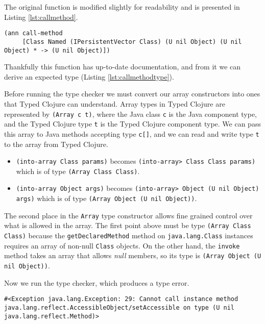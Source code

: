 The original function is modified slightly for readability and is presented in Listing \ref{lst:callmethod}.

\begin{lstlisting}[caption=call-method Type Annotation, label=lst:callmethodtype]
(ann call-method 
     [Class Named (IPersistentVector Class) (U nil Object) (U nil Object) * -> (U nil Object)])
\end{lstlisting}

Thankfully this function has up-to-date documentation, and from it we can derive an expected type
(Listing \ref{lst:callmethodtype}).

Before running the type checker we must convert our array constructors into ones that Typed Clojure
can understand. Array types in Typed Clojure are represented by \lstinline|(Array c t)|, where
the Java class \lstinline|c| is the Java component type,
and the Typed Clojure type \lstinline|t| is the Typed Clojure component type. 
We can pass this array to Java methods accepting
type \lstinline|c[]|, and we can read and write type \lstinline|t| to the array from Typed Clojure.

\begin{itemize}
\item \lstinline|(into-array Class params)| becomes \lstinline|(into-array> Class Class params)|
      which is of type \lstinline|(Array Class Class)|.
\item \lstinline|(into-array Object args)| becomes \lstinline|(into-array> Object (U nil Object) args)|
      which is of type \lstinline|(Array Object (U nil Object))|.
\end{itemize}

The second place in the \lstinline|Array| type constructor allows fine grained control over what is allowed
in the array. The first point above must be type \lstinline|(Array Class Class)| because the 
\lstinline|getDeclaredMethod| method on \lstinline|java.lang.Class| instances requires an array of non-null
\lstinline|Class| objects. On the other hand, the \lstinline|invoke| method takes an array that allows
\emph{null} members, so its type is \lstinline|(Array Object (U nil Object))|.

Now we run the type checker, which produces a type error.

\begin{lstlisting}
#<Exception java.lang.Exception: 29: Cannot call instance method java.lang.reflect.AccessibleObject/setAccessible on type (U nil java.lang.reflect.Method)>
\end{lstlisting}

